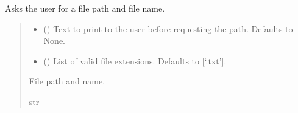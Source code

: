 \documentclass[letterpaper,10pt,english]{sphinxmanual}
\begin{document}
\begin{fulllineitems}
\begin{fulllineitems}
\label{\detokenize{Setup.Inputs:Setup.Inputs.GetUserInput.UserInput.GetFilePath}}
\pysigstartsignatures
{}
\pysigstopsignatures
\sphinxAtStartPar
Asks the user for a file path and file name.
\begin{quote}\begin{description}
\begin{itemize}
\item {} 
\sphinxAtStartPar
{} (\sphinxstyleliteralemphasis{\sphinxupquote{ | }}\sphinxstyleliteralemphasis{\sphinxupquote{, }}) \textendash{} Text to print to the user before requesting the path. Defaults to None.

\item {} 
\sphinxAtStartPar
{} (\sphinxstyleliteralemphasis{\sphinxupquote{{[}}}\sphinxstyleliteralemphasis{\sphinxupquote{{]}}}\sphinxstyleliteralemphasis{\sphinxupquote{, }}) \textendash{} List of valid file extensions. Defaults to {[}‘.txt’{]}.

\end{itemize}

\sphinxAtStartPar
File path and name.

\sphinxAtStartPar
str

\end{description}\end{quote}

\end{fulllineitems}


\end{fulllineitems}
\end{document}
